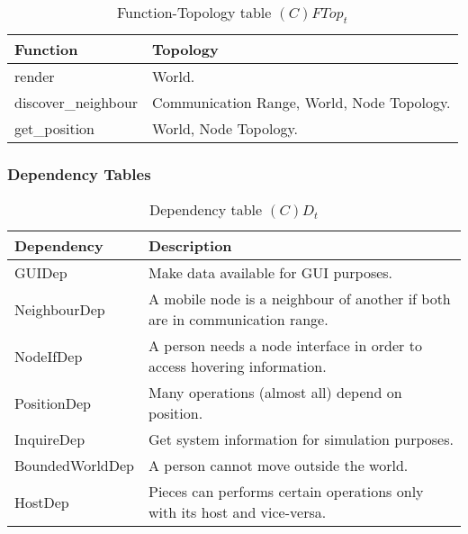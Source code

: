 \begin{table}[H]
	\centering
	\begin{tabular}{|p{4cm}|p{8cm}|}
			\hline
			\textbf{Function} & \textbf{Topology} \\
			\hline
			render & World.\\
			\hline
			discover\_neighbour & Communication Range, World, Node Topology. \\
			\hline
			get\_position & World, Node Topology. \\
			\hline
		\end{tabular}
	\caption{Function-Topology table $(C)FTop_t$}
	\label{tab:cftopt}
\end{table}


\subsubsection{Dependency Tables}

\begin{table}[H]
	\centering
	\begin{tabular}{|p{4cm}|p{8cm}|}
			\hline
			\textbf{Dependency} & \textbf{Description} \\
			\hline
			GUIDep & Make data available for GUI purposes. \\
			\hline
			NeighbourDep & A mobile node is a neighbour of another if both are in
			communication range. \\
			\hline
      NodeIfDep & A person needs a node interface in order to access hovering
      information. \\
			\hline
      PositionDep & Many operations (almost all) depend on position. \\
			\hline
			InquireDep & Get system information for simulation purposes. \\
			\hline
			BoundedWorldDep & A person cannot move outside the world. \\
			\hline
			HostDep & Pieces can performs certain operations only with its host and vice-versa. \\
			\hline
		\end{tabular}
	\caption{Dependency table $(C)D_t$}
	\label{tab:cdt}
\end{table}

